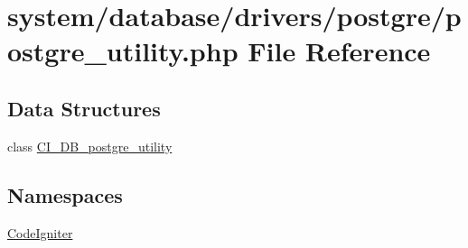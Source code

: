 \hypertarget{postgre__utility_8php}{}\section{system/database/drivers/postgre/postgre\+\_\+utility.php File Reference}
\label{postgre__utility_8php}
\subsection*{Data Structures}
\begin{DoxyCompactItemize}
\item 
class \mbox{\hyperlink{class_c_i___d_b__postgre__utility}{C\+I\+\_\+\+D\+B\+\_\+postgre\+\_\+utility}}
\end{DoxyCompactItemize}
\subsection*{Namespaces}
\begin{DoxyCompactItemize}
\item 
 \mbox{\hyperlink{namespace_code_igniter}{Code\+Igniter}}
\end{DoxyCompactItemize}
